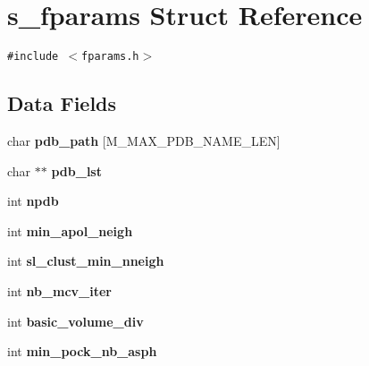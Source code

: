 \hypertarget{structs__fparams}{
\section{s\_\-fparams Struct Reference}
\label{structs__fparams}
}
{\tt \#include $<$fparams.h$>$}

\subsection*{Data Fields}
\begin{CompactItemize}
\item 
\hypertarget{structs__fparams_4e1b3892d1e42947408cdcaed497bf97}{
char \textbf{pdb\_\-path} \mbox{[}M\_\-MAX\_\-PDB\_\-NAME\_\-LEN\mbox{]}}
\label{structs__fparams_4e1b3892d1e42947408cdcaed497bf97}

\item 
\hypertarget{structs__fparams_b620ac1ea6b8ad4c4ed0b95a8664a560}{
char $\ast$$\ast$ \textbf{pdb\_\-lst}}
\label{structs__fparams_b620ac1ea6b8ad4c4ed0b95a8664a560}

\item 
\hypertarget{structs__fparams_5427055e24cc2dea5c41a9fd6bba8cac}{
int \textbf{npdb}}
\label{structs__fparams_5427055e24cc2dea5c41a9fd6bba8cac}

\item 
\hypertarget{structs__fparams_b0875eddf8815f766657713b3f4ba0b0}{
int \textbf{min\_\-apol\_\-neigh}}
\label{structs__fparams_b0875eddf8815f766657713b3f4ba0b0}

\item 
\hypertarget{structs__fparams_b23279857aaf7861b452cd2bf463f624}{
int \textbf{sl\_\-clust\_\-min\_\-nneigh}}
\label{structs__fparams_b23279857aaf7861b452cd2bf463f624}

\item 
\hypertarget{structs__fparams_8caeadbae2db7d24763497290e6b9220}{
int \textbf{nb\_\-mcv\_\-iter}}
\label{structs__fparams_8caeadbae2db7d24763497290e6b9220}

\item 
\hypertarget{structs__fparams_289a1193bf0ffa2f737cd9dc914b63e0}{
int \textbf{basic\_\-volume\_\-div}}
\label{structs__fparams_289a1193bf0ffa2f737cd9dc914b63e0}

\item 
\hypertarget{structs__fparams_2ccafe788e970f4e00bdae591d834865}{
int \textbf{min\_\-pock\_\-nb\_\-asph}}
\label{structs__fparams_2ccafe788e970f4e00bdae591d834865}


\end{CompactItemize}
